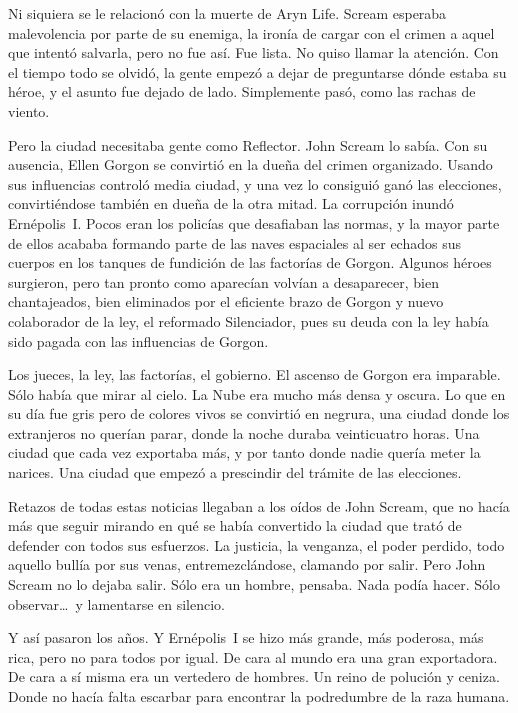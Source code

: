 Ni siquiera se le relacionó con la muerte de Aryn Life. Scream esperaba malevolencia por parte de su enemiga, la ironía de cargar con el crimen a aquel que intentó salvarla, pero no fue así. Fue lista. No quiso llamar la atención. Con el tiempo todo se olvidó, la gente empezó a dejar de preguntarse dónde estaba su héroe, y el asunto fue dejado de lado. Simplemente pasó, como las rachas de viento.

Pero la ciudad necesitaba gente como Reflector. John Scream lo sabía. Con su ausencia, Ellen Gorgon se convirtió en la dueña del crimen organizado. Usando sus influencias controló media ciudad, y una vez lo consiguió ganó las elecciones, convirtiéndose también en dueña de la otra mitad. La corrupción inundó Ernépolis~I. Pocos eran los policías que desafiaban las normas, y la mayor parte de ellos acababa formando parte de las naves espaciales al ser echados sus cuerpos en los tanques de fundición de las factorías de Gorgon. Algunos héroes surgieron, pero tan pronto como aparecían volvían a desaparecer, bien chantajeados, bien eliminados por el eficiente brazo de Gorgon y nuevo colaborador de la ley, el reformado Silenciador, pues su deuda con la ley había sido pagada con las influencias de Gorgon.

Los jueces, la ley, las factorías, el gobierno. El ascenso de Gorgon era imparable. Sólo había que mirar al cielo. La Nube era mucho más densa y oscura. Lo que en su día fue gris pero de colores vivos se convirtió en negrura, una ciudad donde los extranjeros no querían parar, donde la noche duraba veinticuatro horas. Una ciudad que cada vez exportaba más, y por tanto donde nadie quería meter la narices. Una ciudad que empezó a prescindir del trámite de las elecciones.

Retazos de todas estas noticias llegaban a los oídos de John Scream, que no hacía más que seguir mirando en qué se había convertido la ciudad que trató de defender con todos sus esfuerzos. La justicia, la venganza, el poder perdido, todo aquello bullía por sus venas, entremezclándose, clamando por salir. Pero John Scream no lo dejaba salir. Sólo era un hombre, pensaba. Nada podía hacer. Sólo observar\dots\ y lamentarse en silencio.

Y así pasaron los años. Y Ernépolis~I se hizo más grande, más poderosa, más rica, pero no para todos por igual. De cara al mundo era una gran exportadora. De cara a sí misma era un vertedero de hombres. Un reino de polución y ceniza. Donde no hacía falta escarbar para encontrar la podredumbre de la raza humana.

